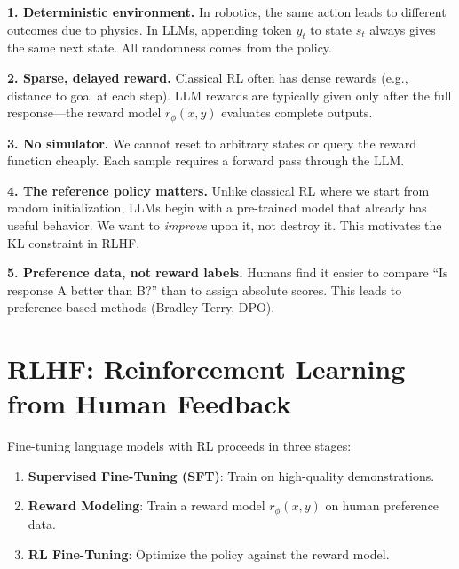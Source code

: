 \begin{remark}
    \textbf{1. Deterministic environment.} In robotics, the same action leads to different outcomes due to physics. In LLMs, appending token $y_t$ to state $s_t$ always gives the same next state. All randomness comes from the policy.

    \textbf{2. Sparse, delayed reward.} Classical RL often has dense rewards (e.g., distance to goal at each step). LLM rewards are typically given only after the full response---the reward model $r_\phi(x,y)$ evaluates complete outputs.

    \textbf{3. No simulator.} We cannot reset to arbitrary states or query the reward function cheaply. Each sample requires a forward pass through the LLM.

    \textbf{4. The reference policy matters.} Unlike classical RL where we start from random initialization, LLMs begin with a pre-trained model that already has useful behavior. We want to \emph{improve} upon it, not destroy it. This motivates the KL constraint in RLHF.

    \textbf{5. Preference data, not reward labels.} Humans find it easier to compare ``Is response A better than B?'' than to assign absolute scores. This leads to preference-based methods (Bradley-Terry, DPO).
\end{remark}

\section{RLHF: Reinforcement Learning from Human Feedback}

Fine-tuning language models with RL proceeds in three stages:
\begin{enumerate}
    \item \textbf{Supervised Fine-Tuning (SFT)}: Train on high-quality demonstrations.
    \item \textbf{Reward Modeling}: Train a reward model $r_\phi(x, y)$ on human preference data.
    \item \textbf{RL Fine-Tuning}: Optimize the policy against the reward model.
\end{enumerate}


